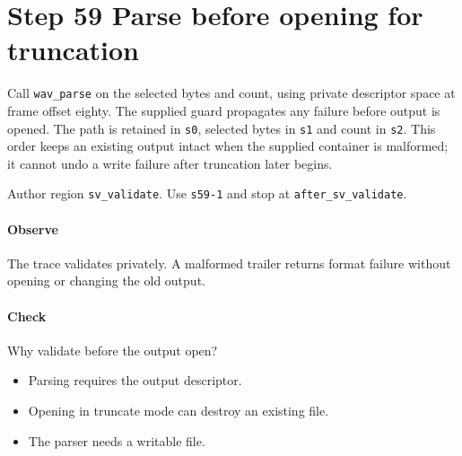 \section{Step 59 Parse before opening for truncation}\label{pcm-wav-s59}
Call \texttt{wav\_parse} on the selected bytes and count, using private descriptor space at frame offset eighty. The supplied guard propagates any failure before output is opened. The path is retained in \texttt{s0}, selected bytes in \texttt{s1} and count in \texttt{s2}. This order keeps an existing output intact when the supplied container is malformed; it cannot undo a write failure after truncation later begins.

Author region \texttt{sv\_validate}. Use \texttt{s59-1} and stop at \texttt{after\_sv\_validate}.

\paragraph{Observe} The trace validates privately. A malformed trailer returns format failure without opening or changing the old output.

\paragraph{Check} Why validate before the output open?
\begin{itemize}
\item[A.] Parsing requires the output descriptor.
\item[B.] Opening in truncate mode can destroy an existing file.
\item[C.] The parser needs a writable file.
\end{itemize}
